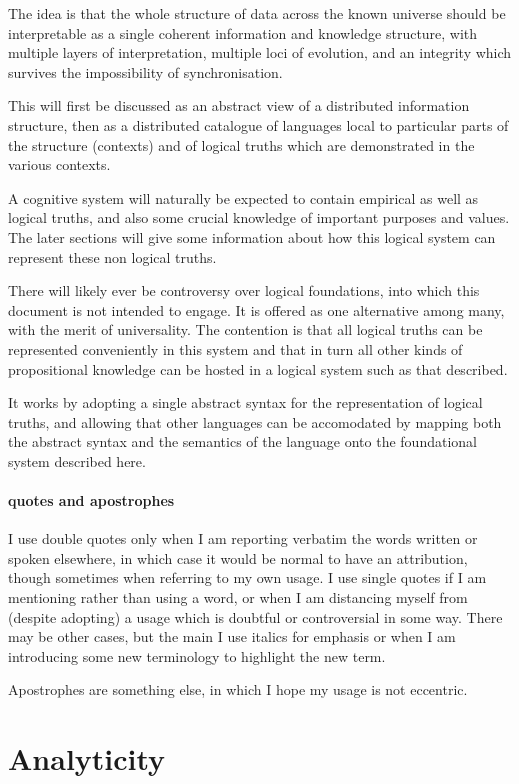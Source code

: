 \documentclass[10pt,titlepage]{article}
\begin{document}
The idea is that the whole structure of data across the known universe should be interpretable as a single coherent information and knowledge structure, with multiple layers of interpretation, multiple loci of evolution, and an integrity which survives the impossibility of synchronisation.

This will first be discussed as an abstract view of a distributed information structure, then as a distributed catalogue of languages local to particular parts of the structure (contexts) and of logical truths which are demonstrated in the various contexts.

A cognitive system will naturally be expected to contain empirical as well as logical truths, and also some crucial knowledge of important purposes and values.
The later sections will give some information about how this logical system can represent these non logical truths.

There will likely ever be controversy over logical foundations, into which this document is not intended to engage.
It is offered as one alternative among many, with the merit of universality.
The contention is that all logical truths can be represented conveniently in this system and that in turn all other kinds of propositional knowledge can be hosted in a logical system such as that described.

It works by adopting a single abstract syntax for the representation of logical truths, and allowing that other languages can be accomodated by mapping both the abstract syntax and the semantics of the language onto the foundational system described here.

\paragraph{quotes and apostrophes}

I use double quotes only when I am reporting verbatim the words written or spoken elsewhere, in which case it would be normal to have an attribution, though sometimes when referring to my own usage.
I use single quotes if I am mentioning rather than using a word, or when I am distancing myself from (despite adopting) a usage which is doubtful or controversial in some way.
There may be other cases, but the main
I use italics for emphasis or when I am introducing some new terminology to highlight the new term.

Apostrophes are something else, in which I hope my usage is not eccentric.

\section{Analyticity}
\end{document}

